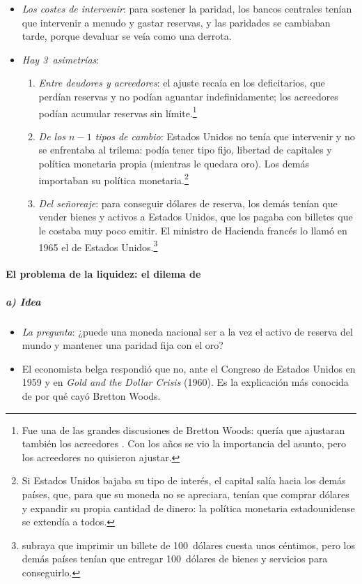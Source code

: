 \documentclass[11pt]{article}
\begin{document}
\begin{itemize}
\item \emph{Los costes de intervenir}: para sostener la paridad, los bancos centrales tenían que intervenir a menudo y gastar reservas, y las paridades se cambiaban tarde, porque devaluar se veía como una derrota.
\item \emph{Hay 3~asimetrías}:
  \begin{enumerate}
  \item \emph{Entre deudores y acreedores}: el ajuste recaía en los deficitarios, que perdían reservas y no podían aguantar indefinidamente; los acreedores podían acumular reservas sin límite.\footnote{Fue una de las grandes discusiones de Bretton Woods:  quería que ajustaran también los acreedores . Con los años se vio la importancia del asunto, pero los acreedores no quisieron ajustar.}
  \item \emph{De los $n-1$ tipos de cambio}: Estados Unidos no tenía que intervenir y no se enfrentaba al trilema: podía tener tipo fijo, libertad de capitales y política monetaria propia (mientras le quedara oro). Los demás importaban su política monetaria.\footnote{Si Estados Unidos bajaba su tipo de interés, el capital salía hacia los demás países, que, para que su moneda no se apreciara, tenían que comprar dólares y expandir su propia cantidad de dinero: la política monetaria estadounidense se extendía a todos.}
  \item \emph{Del señoreaje}: para conseguir dólares de reserva, los demás tenían que vender bienes y activos a Estados Unidos, que los pagaba con billetes que le costaba muy poco emitir. El ministro de Hacienda francés  lo llamó en 1965 el  de Estados Unidos\nocite{Eichengreen2011Exorbitant}.\footnote{ subraya que imprimir un billete de 100~dólares cuesta unos céntimos, pero los demás países tenían que entregar 100~dólares de bienes y servicios para conseguirlo.}
  \end{enumerate}
\end{itemize}

\paragraph{El problema de la liquidez: el dilema de }\label{sec:triffin}

\subparagraph{a) Idea}

\begin{itemize}
\item \emph{La pregunta}: ¿puede una moneda nacional ser a la vez el activo de reserva del mundo y mantener una paridad fija con el oro?
\item El economista belga  respondió que no, ante el Congreso de Estados Unidos en 1959 y en \emph{Gold and the Dollar Crisis} (1960)\nocite{Triffin1960}. Es la explicación más conocida de por qué cayó Bretton Woods.
\end{itemize}
\end{document}
